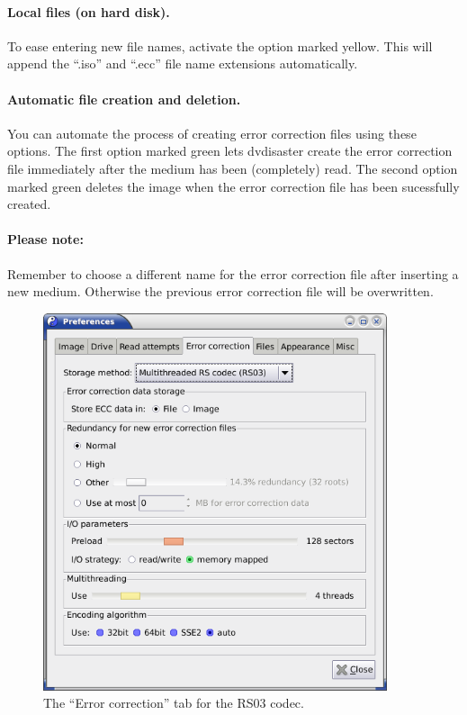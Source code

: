 \paragraph{Local files (on hard disk).} To ease entering new file names,
activate the option marked yellow.
This will append the ``.iso'' and ``.ecc'' file name extensions automatically.

\paragraph{Automatic file creation and deletion.} You can automate the
process of creating error correction files using these options. The
first option marked green lets dvdisaster create the error correction
file immediately after the medium has been (completely) read.
The second option marked green deletes the image when the error correction
file has been sucessfully created.

\bigskip

\paragraph{Please note:} Remember to choose a different name for the error
correction file after inserting a new medium. Otherwise the
previous error correction file will be overwritten. 

\newpage

\begin{figure}[h]
\centerline{\includegraphics[width=0.9\textwidth]{screenshots/eccfile-prefs-ecc3-adv.png}}
\caption{The ``Error correction'' tab for the RS03 codec.}  
\label{howto-eccfile-prefs-ecc3-image-adv}
\end{figure}

